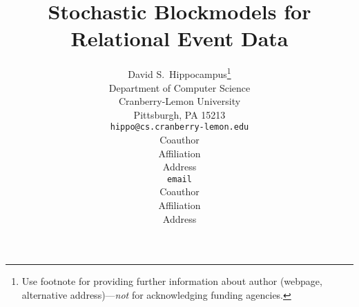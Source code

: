 \documentclass{article}
\title{Stochastic Blockmodels for Relational Event Data}
\author{
David S.~Hippocampus\thanks{ Use footnote for providing further information
about author (webpage, alternative address)---\emph{not} for acknowledging
funding agencies.} \\
Department of Computer Science\\
Cranberry-Lemon University\\
Pittsburgh, PA 15213 \\
\texttt{hippo@cs.cranberry-lemon.edu} \\
\And
Coauthor \\
Affiliation \\
Address \\
\texttt{email} \\
\AND
Coauthor \\
Affiliation \\
Address \\
}
\begin{document}
\maketitle
\savenotes










\spewnotes
\end{document}
